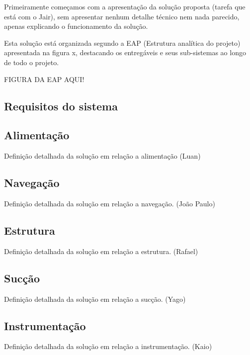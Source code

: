 Primeiramente começamos com a apresentação da solução proposta (tarefa que está com o Jair), sem apresentar nenhum detalhe técnico nem nada parecido, apenas explicando o funcionamento da solução. 

Esta solução está organizada segundo a EAP (Estrutura analítica do projeto) apresentada na figura x, destacando os entregáveis e seus sub-sistemas ao longo de todo o projeto.

FIGURA DA EAP AQUI!

\subsection{Requisitos do sistema} %
\label{sub:requisitos_do_sistema}

\subsection{Alimentação} %
\label{sub:alimentação}
	Definição detalhada da solução em relação a alimentação (Luan)

\subsection{Navegação} %
\label{sub:automação}
	Definição detalhada da solução em relação a navegação. (João Paulo)

\subsection{Estrutura} %
\label{sub:alimentação}
	Definição detalhada da solução em relação a estrutura. (Rafael)

\subsection{Sucção} %
\label{sub:aspirador}
	Definição detalhada da solução em relação a sucção. (Yago)

\subsection{Instrumentação} %
\label{sub:instrumentação}
	Definição detalhada da solução em relação a instrumentação. (Kaio)

